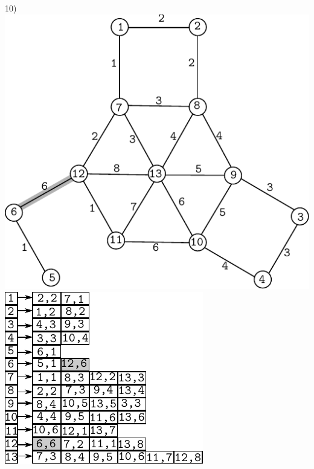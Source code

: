\documentclass{article}
\begin{document}
\begin{center}
10)\includegraphics[scale=0.6]{bottleneck/g10}
\hspace{5mm}
\includegraphics[scale=0.9]{bottleneck/l10}
\end{center}
\end{document}
